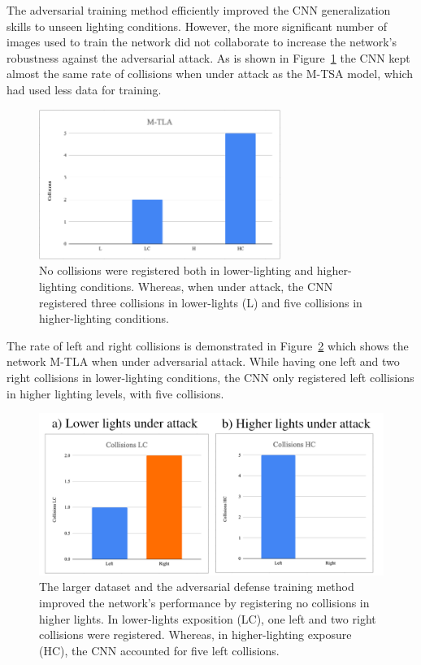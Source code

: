 \documentclass[12pt]{article}
\begin{document}
The adversarial training method efficiently improved the CNN generalization skills to unseen lighting conditions. However, the more significant number of images used to train the network did not collaborate to increase the network's robustness against the adversarial attack. As is shown in Figure~\ref{fig:mtlacollisions} the CNN kept almost the same rate of collisions when under attack as the M-TSA model, which had used less data for training. 

\begin{figure}[H]
\begin{center}
\includegraphics[width=0.7\textwidth]{figures/mtla-collisions-total.png}
\caption{No collisions were registered both in lower-lighting and higher-lighting conditions. Whereas, when under attack, the CNN registered three collisions in lower-lights (L) and five collisions in higher-lighting conditions.}
\label{fig:mtlacollisions}
\end{center}
\end{figure}

The rate of left and right collisions is demonstrated in Figure~\ref{fig:mtlaleftright} which shows the network M-TLA when under adversarial attack. While having one left and two right collisions in lower-lighting conditions, the CNN only registered left collisions in higher lighting levels, with five collisions. 

\begin{figure}[H]
\begin{center}
\includegraphics[width=1.0\textwidth]{figures/mtlaleftrightcollisions.png}
\caption{ The larger dataset and the adversarial defense training method improved the network's performance by registering no collisions in higher lights. In lower-lights exposition (LC), one left and two right collisions were registered. Whereas, in higher-lighting exposure (HC), the CNN accounted for five left collisions.}
\label{fig:mtlaleftright}
\end{center}
\end{figure}
\end{document}
